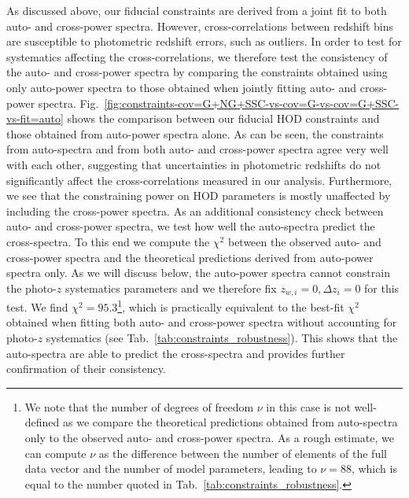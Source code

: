\documentclass[a4paper,11pt]{article}
\begin{document}
      As discussed above, our fiducial constraints are derived from a joint fit to both auto- and cross-power spectra. However, cross-correlations between redshift bins are susceptible to photometric redshift errors, such as outliers. In order to test for systematics affecting the cross-correlations, we therefore test the consistency of the auto- and cross-power spectra by comparing the constraints obtained using only auto-power spectra to those obtained when jointly fitting auto- and cross-power spectra. Fig.~\ref{fig:constraints-cov=G+NG+SSC-vs-cov=G-vs-cov=G+SSC-vs-fit=auto} shows the comparison between our fiducial HOD constraints and those obtained from auto-power spectra alone. As can be seen, the constraints from auto-spectra and from both auto- and cross-power spectra agree very well with each other, suggesting that uncertainties in photometric redshifts do not significantly affect the cross-correlations measured in our analysis. Furthermore, we see that the constraining power on HOD parameters is mostly unaffected by including the cross-power spectra. As an additional consistency check between auto- and cross-power spectra, we test how well the auto-spectra predict the cross-spectra. To this end we compute the $\chi^{2}$ between the observed auto- and cross-power spectra and the theoretical predictions derived from auto-power spectra only. As we will discuss below, the auto-power spectra cannot constrain the photo-$z$ systematics parameters and we therefore fix $z_{w, i} = 0, \Delta z_{i} = 0$ for this test. We find $\chi^{2} = 95.3$\footnote{We note that the number of degrees of freedom $\nu$ in this case is not well-defined as we compare the theoretical predictions obtained from auto-spectra only to the observed auto- and cross-power spectra. As a rough estimate, we can compute $\nu$ as the difference between the number of elements of the full data vector and the number of model parameters, leading to $\nu = 88$, which is equal to the number quoted in Tab.~\ref{tab:constraints_robustness}.}, which is practically equivalent to the best-fit $\chi^{2}$ obtained when fitting both auto- and cross-power spectra without accounting for photo-$z$ systematics (see Tab.~\ref{tab:constraints_robustness}). This shows that the auto-spectra are able to predict the cross-spectra and provides further confirmation of their consistency. 
\end{document}
